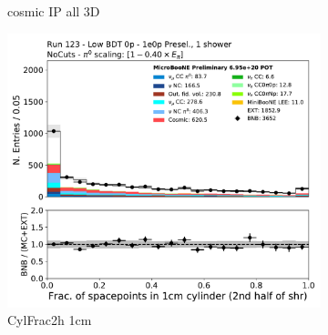 \begin{figure}[H]
\begin{subfigure}{0.3\textwidth}
    \caption{cosmic IP all 3D}
    \end{subfigure}
    \begin{subfigure}{0.3\textwidth}
    \includegraphics[width=1.0\textwidth]{1e0p/Low_BDT_Sideband/CylFrac2h_1cm.pdf}
    \caption{CylFrac2h 1cm}
    \end{subfigure}
    \caption{} 
    \label{fig:HE_1eNp_1}
\end{figure}

